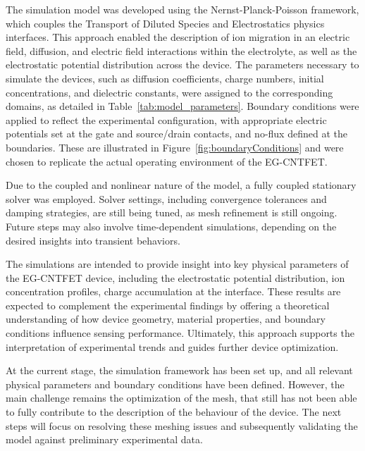 The simulation model was developed using the Nernst-Planck-Poisson framework, which couples the Transport of Diluted Species and Electrostatics physics interfaces. This approach enabled the description of ion migration in an electric field, diffusion, and electric field interactions within the electrolyte, as well as the electrostatic potential distribution across the device. The parameters necessary to simulate the devices, such as diffusion coefficients, charge numbers, initial concentrations, and dielectric constants, were assigned to the corresponding domains, as detailed in Table~\ref{tab:model_parameters}. Boundary conditions were applied to reflect the experimental configuration, with appropriate electric potentials set at the gate and source/drain contacts, and no-flux defined at the boundaries. These are illustrated in Figure~\ref{fig:boundaryConditions} and were chosen to replicate the actual operating environment of the EG-CNTFET.

Due to the coupled and nonlinear nature of the model, a fully coupled stationary solver was employed. Solver settings, including convergence tolerances and damping strategies, are still being tuned, as mesh refinement is still ongoing. Future steps may also involve time-dependent simulations, depending on the desired insights into transient behaviors.

The simulations are intended to provide insight into key physical parameters of the EG-CNTFET device, including the electrostatic potential distribution, ion concentration profiles, charge accumulation at the interface. These results are expected to complement the experimental findings by offering a theoretical understanding of how device geometry, material properties, and boundary conditions influence sensing performance. Ultimately, this approach supports the interpretation of experimental trends and guides further device optimization.

At the current stage, the simulation framework has been set up, and all relevant physical parameters and boundary conditions have been defined. However, the main challenge remains the optimization of the mesh, that still has not been able to fully contribute to the description of the behaviour of the device. The next steps will focus on resolving these meshing issues and subsequently validating the model against preliminary experimental data.

